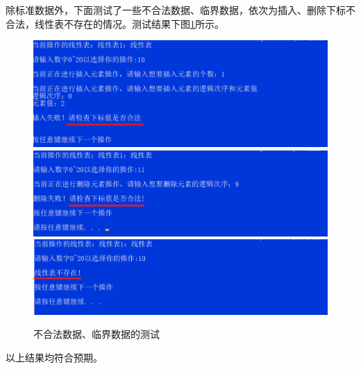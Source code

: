 \documentclass[supercite]{Experimental_Report}
\theoremstyle{definition}
\begin{document}
\begin{enumerate}
	\newpage

	除标准数据外，下面测试了一些不合法数据、临界数据，依次为插入、删除下标不合法，线性表不存在的情况。测试结果下图\ref{fig1-18}所示。
	\begin{figure}[htb] %
		\begin{center}
			\includegraphics[scale=0.6]{./images/顺序表/3_1.png}
			\includegraphics[scale=0.6]{./images/顺序表/3_2.png}
			\includegraphics[scale=0.6]{./images/顺序表/3_3.png}
			\caption{不合法数据、临界数据的测试}
			\label{fig1-18}
		\end{center}
	\end{figure}

	以上结果均符合预期。
\end{enumerate}
\newpage
\end{document}
